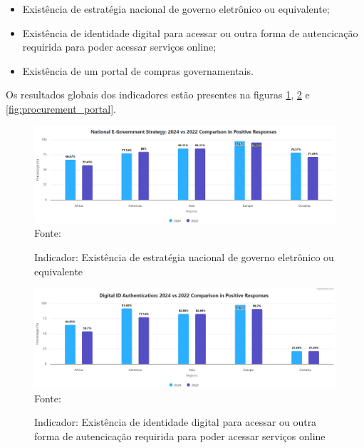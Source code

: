 \begin{itemize}
    \item Existência de estratégia nacional de governo eletrônico ou equivalente;
    \item Existência de identidade digital para acessar ou outra forma de autencicação requirida para poder acessar serviços online;
    \item Existência de um portal de compras governamentais.
\end{itemize}

Os resultados globais dos indicadores estão presentes na figuras \ref{fig:national_government_strategy}, \ref{fig:national_identity} e \ref{fig:procurement_portal}.

\begin{figure}[H]
	\centering
	\caption{Indicador: Existência de estratégia nacional de governo eletrônico ou equivalente}
	\includegraphics[width=1\linewidth]{figuras/ict_in_government/national_government_strategy}
	\label{fig:national_government_strategy}
	\footnotesize{Fonte: \cite{ONU_ICT_in_government_indicators}}
\end{figure}

\begin{figure}[H]
	\centering
	\caption{Indicador: Existência de identidade digital para acessar ou outra forma de autencicação requirida para poder acessar serviços online}
	\includegraphics[width=1\linewidth]{figuras/ict_in_government/digital_identity}
	\label{fig:national_identity}
	\footnotesize{Fonte: \cite{ONU_ICT_in_government_indicators}}
\end{figure}

